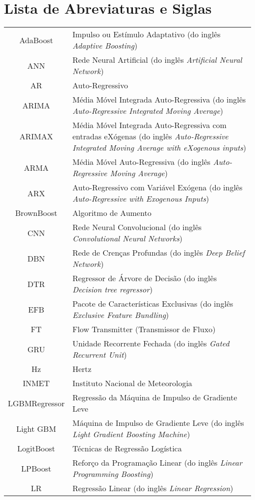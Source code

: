 \newpage
{}
\section*{Lista de Abreviaturas e Siglas}



\begin{tabular}{cp{}}
	AdaBoost & Impulso ou Estímulo Adaptativo (do inglês \textit{Adaptive Boosting}) \\
	ANN & Rede Neural Artificial (do inglês \textit{Artificial Neural Network}) \\
	AR & Auto-Regressivo\\
	ARIMA & Média Móvel Integrada Auto-Regressiva (do inglês \textit{Auto-Regressive Integrated Moving Average}) \\
	ARIMAX & Média Móvel Integrada Auto-Regressiva com entradas eXógenas (do inglês \textit{Auto-Regressive Integrated Moving Average with eXogenous inputs})\\
	ARMA & Média Móvel Auto-Regressiva (do inglês \textit{Auto-Regressive Moving Average}) \\
	ARX & Auto-Regressivo com Variável Exógena (do inglês \textit{Auto-Regressive with Exogenous Inputs})\\
	BrownBoost & Algoritmo de Aumento\\
	CNN & Rede Neural Convolucional (do inglês \textit{Convolutional Neural Networks})\\
	DBN & Rede de Crenças Profundas (do inglês \textit{Deep Belief Network}) \\
	DTR & Regressor de Árvore de Decisão (do inglês \textit{Decision tree regressor}) \\
	EFB & Pacote de Características Exclusivas (do inglês \textit{Exclusive Feature Bundling})\\
	FT & Flow Transmitter (Transmissor de Fluxo)\\
	GRU & Unidade Recorrente Fechada (do inglês \textit{Gated Recurrent Unit}) \\
	Hz & Hertz\\
	INMET & Instituto Nacional de Meteorologia\\
	LGBMRegressor & Regressão da Máquina de Impulso de Gradiente Leve\\
	Light GBM & Máquina de Impulso de Gradiente Leve (do inglês \textit{Light Gradient Boosting Machine}) \\
	LogitBoost & Técnicas de Regressão Logística\\
	LPBoost & Reforço da Programação Linear (do inglês \textit{Linear Programming Boosting}) \\
	LR & Regressão Linear (do inglês \textit{Linear Regression})	
\end{tabular}

